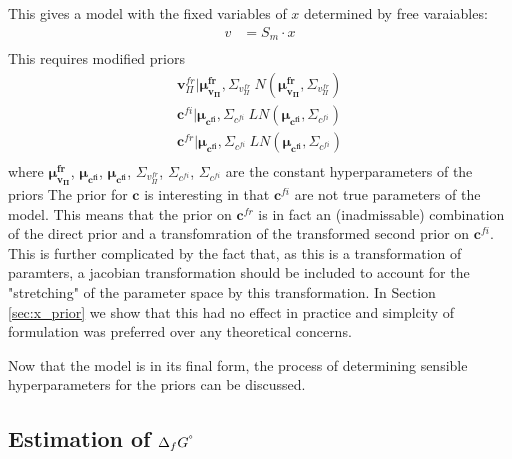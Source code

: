 \documentclass[10pt,letterpaper]{article}
\newcommand{\dgf}{\Delta_fG}
\newcommand{\sdgf}{\Delta_fG^{\degree}}
\newcommand{\bdgf}{\mathbf{\dgf}}
\newcommand{\bc}{\mathbf{c}}
\newcommand{\bv}{\mathbf{v}}
\begin{document}
This gives a model with the fixed variables of $x$ determined by free varaiables:
\begin{align}
    v &= S_m\cdot x\\
\end{align}
This requires modified priors
\begin{align}
    \bv_\Pi^{fr}|\mathbf{\mu_{v_{\Pi}}^{fr}}, \Sigma_{v_{\Pi}^{fr}} ~ N(\mathbf{\mu_{v_{\Pi}}^{fr}}, \Sigma_{v_{\Pi}^{fr}}) \\
    \bc^{fi}|\mathbf{\mu_{c^{fi}}}, \Sigma_{c^{fi}} ~ LN(\mathbf{\mu_{c^{fi}}}, \Sigma_{c^{fi}}) \\
    \bc^{fr}|\mathbf{\mu_{c^{fi}}}, \Sigma_{c^{fi}} ~ LN(\mathbf{\mu_{c^{fi}}}, \Sigma_{c^{fi}}) \\
\end{align}
where $\mathbf{\mu_{v_{\Pi}}^{fr}}$, $\mathbf{\mu_{c^{fi}}}$,  $\mathbf{\mu_{c^{fi}}}$, $\Sigma_{v_{\Pi}^{fr}}$, $\Sigma_{c^{fi}}$, $\Sigma_{c^{fi}}$ are the constant hyperparameters of the priors
The prior for $\bc$ is interesting in that $\bc^{fi}$ are not true parameters of the model.
This means that the prior on $\bc^{fr}$ is in fact an (inadmissable) combination of the direct prior and a transfomration of the transformed second prior on $\bc^{fi}$.
This is further complicated by the fact that, as this is a transformation of paramters, a jacobian transformation should be included to account for the "stretching" of the parameter space by this transformation.
In Section \ref{sec:x_prior} we show that this had no effect in practice and simplcity of formulation was preferred over any theoretical concerns.

Now that the model is in its final form, the process of determining sensible hyperparameters for the priors can be discussed.



\subsection{Estimation of $\sdgf$} \label{sec:sdgf_estimation}
\end{document}
